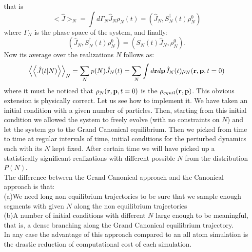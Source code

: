 \documentclass[aps,pre,preprint,unsortedaddress]{revtex4}
\begin{document}
that is
\begin{equation}
<\hat{J}>_{N}=\int d\Gamma_{N}\hat{J}_{N}\rho_{N}(t)=(\hat{J}_{N},S^{\dagger}_{N}(t)\rho_{N}^{0})
\end{equation}
where $\Gamma_{N}$ is the phase space of the system, and finally:
\begin{equation}
 (\hat{J}_{N},S^{\dagger}_{N}(t)\rho_{N}^{0})=(S_{N}(t)\hat{J}_{N}, \rho_{N}^{0}).
\end{equation}
Now its average over the realizations $N$ follows as:
\begin{equation}
\left<\left<\hat{J}(t|N)\right>\right>_{N}=\sum_{N}p(N)\hat{J}_{N}(t)=\sum_{N}\int d{\bf r}d{\bf p}\hat{J}_{N}(t)\rho_{N}({\bf r},{\bf p}, t=0)
\end{equation}
where it must be noticed that $\rho_{N}({\bf r},{\bf p}, t=0)$ is the $\rho_{equil}({\bf r},{\bf p})$.
This obvious extension is physically correct.
Let us see how to implement it. We have taken an initial condition with a given number of particles. Then, starting from this initial condition we allowed the system to freely evolve (with no constraints on $N$) and let the system go to the Grand Canonical equilibrium. Then we picked from time to time at regular intervals of time, initial conditions for the perturbed dynamics each with its $N$ kept fixed. After certain time we will have picked up a statistically significant realizations with different possible $N$ from the distribution $P(N)$.\\
The difference between the Grand Canonical approach and the Canonical approach is that:\\
(a)We need long non equilibrium trajectories to be sure that we sample enough segments with given $N$ along the non equilibrium trajectories\\
(b)A number of initial conditions with different $N$ large enough to be meaningful, that is, a dense branching along the Grand Canonical equilibrium trajectory.\\
In any case the advantage of this approach compared to an all atom simulation is the drastic reduction of computational cost of each simulation. 
{}

\end{document}
